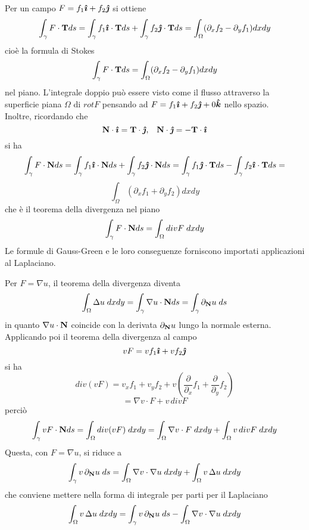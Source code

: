 Per un campo $F= f_1 \boldsymbol{\hat{\imath}} + f_2 \boldsymbol{\hat{\jmath}}$ si ottiene
\[
	\int_{\gamma} F \cdot {\bf T} ds
	= \int_{\gamma} f_1 \boldsymbol{\hat{\imath}} \cdot {\bf T} ds
	+ \int_{\gamma} f_2 \boldsymbol{\hat{\jmath}} \cdot {\bf T} ds
	= \int_{\Omega} (\partial_x f_2 - \partial_y f_1)dxdy
\]
cio\`e la formula di Stokes
\[
	\int_{\gamma} F \cdot {\bf T} ds
	= \int_{\Omega} (\partial_x f_2 - \partial_y f_1)dxdy
\]
nel piano. L'integrale doppio pu\`o essere visto come il flusso attraverso la
superficie piana $\Omega$ di $rot F$ pensando ad $F= f_1 \boldsymbol{\hat{\imath}} + f_2 \boldsymbol{\hat{\jmath}} +0\boldsymbol{\hat{k}}$
nello spazio.\\
Inoltre, ricordando che
\[
	{\bf N} \cdot \boldsymbol{\hat{\imath}}= {\bf T} \cdot \boldsymbol{\hat{\jmath}}, \;\;\;
	{\bf N} \cdot \boldsymbol{\hat{\jmath}}= -{\bf T} \cdot \boldsymbol{\hat{\imath}}
\]
si ha
\[
	\int_{\gamma} F \cdot {\bf N} ds=
	\int_{\gamma} f_1 \boldsymbol{\hat{\imath}} \cdot {\bf N} ds +
	\int_{\gamma} f_2 \boldsymbol{\hat{\jmath}} \cdot {\bf N} ds =
	\int_{\gamma} f_1 \boldsymbol{\hat{\jmath}} \cdot {\bf T} ds -
	\int_{\gamma} f_2 \boldsymbol{\hat{\imath}} \cdot {\bf T} ds =
\]
\[
	\int_{\Omega} \left( \partial_x f_1 + \partial_y f_2 \right)dxdy
\]
che \`e il teorema della divergenza nel piano
\[
	\int_{\gamma} F \cdot {\bf N} ds=
	\int_{\Omega} div F \; dxdy
\]
Le formule di Gauss-Green e le loro conseguenze forniscono importati
applicazioni
al Laplaciano.

Per $F= \nabla u$, il teorema della divergenza diventa
\[
	\int_{\Omega} \Delta u \; dxdy=
	\int_{\gamma} \nabla u \cdot {\bf N} ds =
	\int_{\gamma} \partial_{\bf N} u \; ds
\]
in quanto $\nabla u \cdot {\bf N}$ coincide con la derivata
$ \partial_{\bf N} u$ lungo la normale esterna.\\
Applicando poi il teorema della divergenza al campo
\[
	vF= vf_1 \boldsymbol{\hat{\imath}} + vf_2 \boldsymbol{\hat{\jmath}}
\]
si ha
\[
	div(vF)= v_x f_1 + v_y f_2 +
	v \left( \frac{\partial}{\partial_x} f_1
	+ \frac{\partial}{\partial_y} f_2 \right)
\]
\[
	= \nabla v \cdot F + v\, divF
\]
perci\`o
\[
	\int_{\gamma} vF \cdot {\bf N} ds =
	\int_{\Omega} div(vF) \; dxdy=
	\int_{\Omega} \nabla v \cdot F \; dxdy +
	\int_{\Omega} v\, divF \; dxdy
\]
Questa, con $F= \nabla u$, si riduce a
\[
	\int_{\gamma} v \, \partial_{\bf N} u \; ds =
	\int_{\Omega} \nabla v \cdot \nabla u \; dxdy +
	\int_{\Omega} v\, \Delta u \; dxdy
\]
che conviene mettere nella forma di integrale per parti per il Laplaciano
\[
	\int_{\Omega} v\, \Delta u \; dxdy =
	\int_{\gamma} v \, \partial_{\bf N} u \; ds -
	\int_{\Omega} \nabla v \cdot \nabla u \; dxdy
\]
